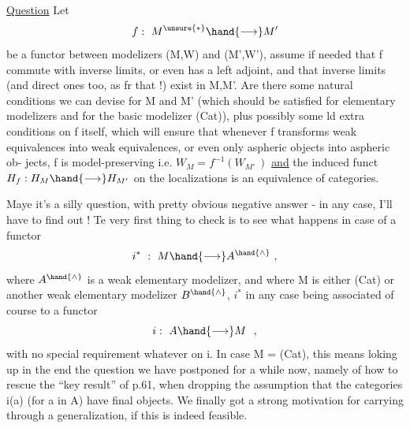 
\uline{Question}  Let
\[ f:\ M^{\unsure{*}}\hand{\longrightarrow} M' \]
be a functor between modelizers (M,W) and (M',W'),  assume  if
needed that f commute with  inverse limits,  or even has a left adjoint,
and that  inverse limits (and direct ones too,  as fr that !)
exist in M,M'.  Are there some natural conditions we can devise for
M and M'  (which should be satisfied for elementary modelizers and for
the basic modelizer (Cat)),  plus possibly some ld extra conditions on
f itself,  which will ensure that whenever f transforms weak equivalences
into weak equivalences,  or even only aspheric objects into aspheric ob-%
jects,  f is model-preserving i.e.  $W_M = f^{-1}(W_{M'}\ )$  \uline{and} the induced funct
$H_f : H_M \hand{\longrightarrow} H_{M'}$  on the localizations is an equivalence of categories.

Maye it's a silly question,  with pretty obvious negative answer
-  in any case,  I'll have to find out !  Te very first thing to check
is to see what happens in case of a functor
\[ i^{*}\ :\ M\hand{\longrightarrow} A^{\hand{\wedge}}\ , \]
where $A^{\hand{\wedge}}$ is a weak elementary modelizer,  and where M is either (Cat) or
another weak elementary modelizer $B^{\hand{\wedge}}$,  $i^{*}$ in any case being associated of
course to a functor
\[ i:\ A\hand{\longrightarrow} M\ \ , \]
with  no special requirement whatever on i.   In case  M = (Cat),  this
means loking up in the end the question we have postponed for  a while
now,  namely of how to rescue the ``key result'' of p.61,  when dropping the
assumption that the categories i(a)  (for a in A) have final objects. We
finally got a strong motivation for carrying through a generalization,  if
this is indeed feasible.

